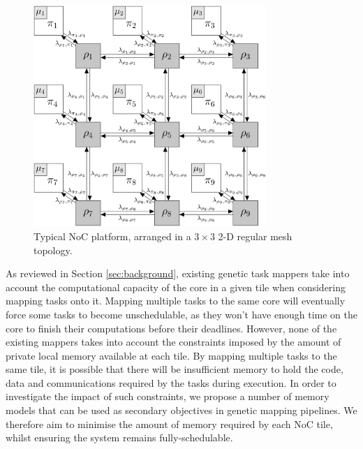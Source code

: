 \documentclass[10pt,conference]{IEEEtran}
\begin{document}
\vspace{-0.5ex}
\begin{figure}[!ht]
  \centering
  \includegraphics*[width=8.8cm,keepaspectratio]{fig/noc-schematic}
  \caption{Typical NoC platform, arranged in a $3\times3$ 2-D regular mesh topology.}
  \label{fig:noc-schematic}
\end{figure}
\vspace{-0.5ex}

As reviewed in Section \ref{sec:background}, existing genetic task mappers take into account the computational capacity of the core in a given tile when considering mapping tasks onto it. Mapping multiple tasks to the same core will eventually force some tasks to become unschedulable, as they won't have enough time on the core to finish their computations before their deadlines. However, none of the existing mappers takes into account the constraints imposed by the amount of private local memory available at each tile. By mapping multiple tasks to the same tile, it is possible that there will be insufficient memory to hold the code, data and communications required by the tasks during execution. In order to investigate the impact of such constraints, we propose a number of memory models that can be used as secondary objectives in genetic mapping pipelines. We therefore aim to minimise the amount of memory required by each NoC tile, whilst ensuring the system remains fully-schedulable.
\end{document}
